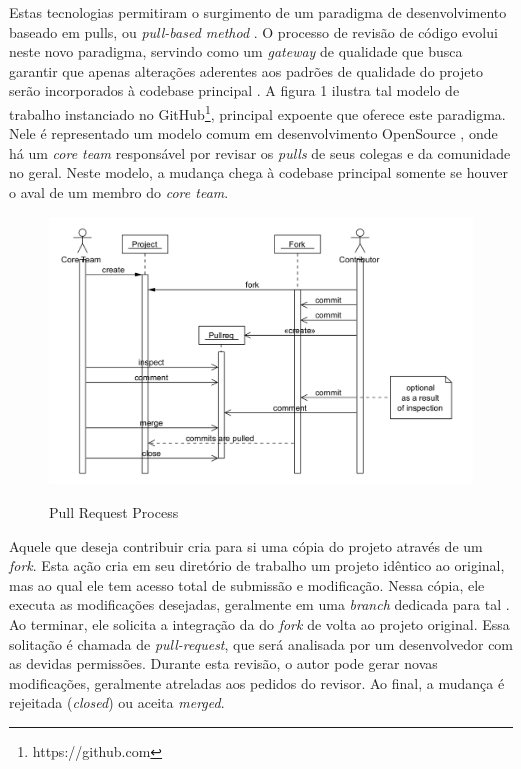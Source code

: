 \documentclass[preprint,review, 12pt]{elsarticle}
\begin{document}
    Estas tecnologias permitiram o surgimento de um paradigma de desenvolvimento baseado em pulls, ou \textit{pull-based method} \cite{gousios2014}. O processo de revisão de código evolui neste novo paradigma, servindo como um \textit{gateway} de qualidade que busca garantir que apenas alterações aderentes aos padrões de qualidade do projeto serão incorporados à codebase principal \cite{gousios2015}. A figura 1 ilustra tal modelo de trabalho instanciado no GitHub\footnote{https://github.com}, principal expoente que oferece este paradigma. Nele é representado um modelo comum em desenvolvimento OpenSource \cite{6385140}, onde há um \textit{core team} responsável por revisar os \textit{pulls} de seus colegas e da comunidade no geral. Neste modelo, a mudança chega à codebase principal somente se houver o aval de um membro do \textit{core team}.

     \begin{figure}[!htbp]
      \includegraphics[width=\textwidth]{pull-request-flow}\label{fig:pull-request-flow}
      \caption{Pull Request Process \cite{gousios2014}}
    \end{figure}

    Aquele que deseja contribuir cria para si uma cópia do projeto através de um \textit{fork}. Esta ação cria em seu diretório de trabalho um projeto idêntico ao original, mas ao qual ele tem acesso total de submissão e modificação. Nessa cópia, ele executa as modificações desejadas, geralmente em uma \textit{branch} dedicada para tal \cite{gousios2016}. Ao terminar, ele solicita a integração da  do \textit{fork} de volta ao projeto original. Essa solitação é chamada de \textit{pull-request}, que será analisada por um desenvolvedor com as devidas permissões. Durante esta revisão, o autor pode gerar novas modificações, geralmente atreladas aos pedidos do revisor. Ao final, a mudança é rejeitada (\textit{closed}) ou aceita \textit{merged}.
\end{document}
